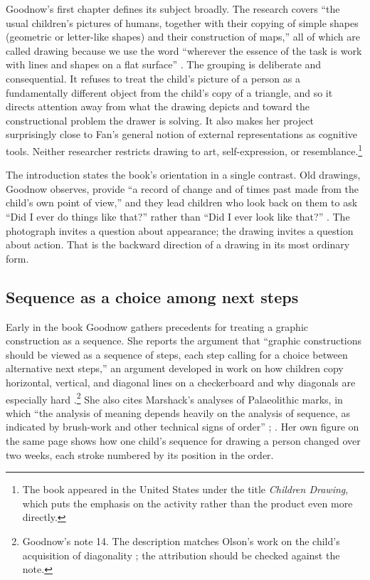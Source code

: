 \documentclass[11pt]{article}
\theoremstyle{remark}
\begin{document}
Goodnow's first chapter defines its subject broadly. The research covers ``the usual children's pictures of humans, together with their copying of simple shapes (geometric or letter-like shapes) and their construction of maps,'' all of which are called drawing because we use the word ``wherever the essence of the task is work with lines and shapes on a flat surface'' \cite[p.~9]{goodnow1977}. The grouping is deliberate and consequential. It refuses to treat the child's picture of a person as a fundamentally different object from the child's copy of a triangle, and so it directs attention away from what the drawing depicts and toward the constructional problem the drawer is solving. It also makes her project surprisingly close to Fan's general notion of external representations as cognitive tools. Neither researcher restricts drawing to art, self-expression, or resemblance.\footnote{The book appeared in the United States under the title \emph{Children Drawing}, which puts the emphasis on the activity rather than the product even more directly.}

The introduction states the book's orientation in a single contrast. Old drawings, Goodnow observes, provide ``a record of change and of times past made from the child's own point of view,'' and they lead children who look back on them to ask ``Did I ever do things like that?'' rather than ``Did I ever look like that?'' \cite[p.~7]{goodnow1977}. The photograph invites a question about appearance; the drawing invites a question about action. That is the backward direction of a drawing in its most ordinary form.

\subsection{Sequence as a choice among next steps}

Early in the book Goodnow gathers precedents for treating a graphic construction as a sequence. She reports the argument that ``graphic constructions should be viewed as a sequence of steps, each step calling for a choice between alternative next steps,'' an argument developed in work on how children copy horizontal, vertical, and diagonal lines on a checkerboard and why diagonals are especially hard \cite[p.~23]{goodnow1977}.\footnote{Goodnow's note 14. The description matches Olson's work on the child's acquisition of diagonality \cite{olson1970}; the attribution should be checked against the note.} She also cites Marshack's analyses of Palaeolithic marks, in which ``the analysis of meaning depends heavily on the analysis of sequence, as indicated by brush-work and other technical signs of order'' \cite[p.~23]{goodnow1977}; \cite{marshack1972}. Her own figure on the same page shows how one child's sequence for drawing a person changed over two weeks, each stroke numbered by its position in the order.
\end{document}

